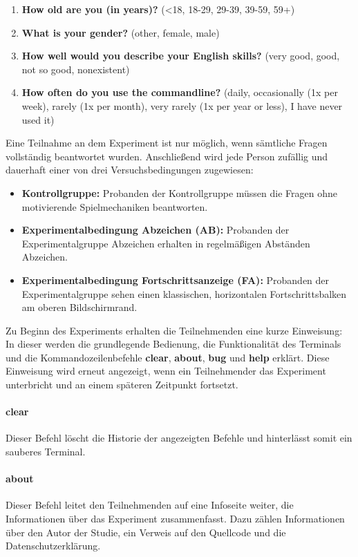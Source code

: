 \begin{enumerate}\label{demography}
	 \item \textbf{How old are you (in years)?} (<18, 18-29, 29-39, 39-59, 59+)
     \item \textbf{What is your gender?} (other, female, male)
     \item \textbf{How well would you describe your English skills?} (very good, good, not so good, nonexistent)
     \item \textbf{How often do you use the commandline?} (daily, occasionally (1x per week), rarely (1x per month), very rarely (1x per year or less), I have never used it)
\end{enumerate}

Eine Teilnahme an dem Experiment ist nur möglich, wenn sämtliche Fragen vollständig beantwortet wurden. Anschließend wird jede Person zufällig und dauerhaft einer von drei Versuchsbedingungen zugewiesen:


\begin{itemize}
	\item \textbf{Kontrollgruppe:} Probanden der Kontrollgruppe müssen die Fragen ohne motivierende Spielmechaniken beantworten.
	 
    \item \textbf{Experimentalbedingung Abzeichen (AB):} Probanden der Experimentalgruppe Abzeichen erhalten in regelmäßigen Abständen Abzeichen.

    \item \textbf{Experimentalbedingung Fortschrittsanzeige (FA):} Probanden der Experimentalgruppe sehen einen klassischen, horizontalen Fortschrittsbalken am oberen Bildschirmrand.
\end{itemize}

Zu Beginn des Experiments erhalten die Teilnehmenden eine kurze Einweisung: In dieser werden die grundlegende Bedienung, die Funktionalität des Terminals und die Kommandozeilenbefehle \textbf{clear}, \textbf{about}, \textbf{bug} und \textbf{help} erklärt. Diese Einweisung wird erneut angezeigt, wenn ein Teilnehmender das Experiment unterbricht und an einem späteren Zeitpunkt fortsetzt.

\paragraph{clear}
Dieser Befehl löscht die Historie der angezeigten Befehle und hinterlässt somit ein sauberes Terminal.

\paragraph{about}
Dieser Befehl leitet den Teilnehmenden auf eine Infoseite weiter, die Informationen über das Experiment zusammenfasst. Dazu zählen Informationen über den Autor der Studie, ein Verweis auf den Quellcode und die Datenschutzerklärung.

